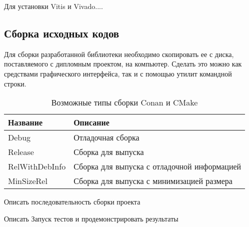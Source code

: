 Для установки Vitis и Vivado.... %

\subsection{Сборка исходных кодов}

Для сборки разработанной библиотеки необходимо скопировать ее с диска, поставляемого
с дипломным проектом, на компьютер. Сделать это можно как средствами
графического интерфейса, так и с помощью утилит командной строки.

\begin{table}[ht]
    \caption{Возможные типы сборки Conan и CMake}
    \label{table:manual:buildTypes}
    \begin{tabular}{| >{\raggedright}m{}
                    | >{\raggedright\arraybackslash}m{}|}
        \hline
        \centering Название & \centering\arraybackslash Описание \\

        \hline
        Debug &
        Отладочная сборка
        \\

        \hline
        Release &
        Сборка для выпуска
        \\

        \hline
        RelWithDebInfo &
        Сборка для выпуска с отладочной информацией
        \\

        \hline
        MinSizeRel &
        Сборка для выпуска с минимизацией размера
        \\

        \hline
    \end{tabular}
\end{table}

\fixTableSectionSpace

Описать последовательность сборки проекта

Описать Запуск тестов и продемонстрировать результаты
